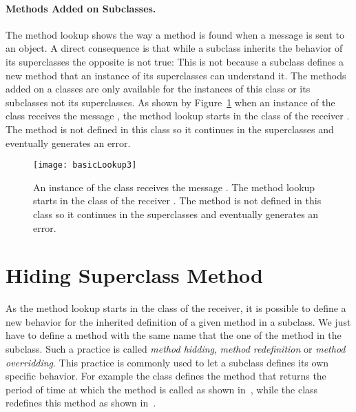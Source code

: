 \paragraph{Methods Added on Subclasses.} 
The method lookup shows the way a method is found when a message is sent to an object. A direct consequence is that while a subclass inherits the behavior of its superclasses the opposite is not true: This is not because a subclass defines a new method that an instance of its superclasses can understand it. The methods added on a classes are only available for the instances of this class or its subclasses not its superclasses. As shown by Figure~\ref{fig:basicLookup3} when an instance of the class  receives the message ,  the method lookup starts in the class of the receiver . The method is not defined in this class so it  continues in the superclasses and eventually generates an error.



\begin{figure}[h]
\centerline{\texttt{[image: basicLookup3]}} 
\caption{An instance of the class  receives the message . The method lookup starts in the class of the receiver . The method is not defined in this class so it  continues in the superclasses and eventually generates an error. \label{fig:basicLookup3}}
\end{figure}




\section{Hiding Superclass Method}
As the method lookup starts in the class of the receiver, it is possible to define a new behavior for the inherited definition of a given method in a subclass. We just have to define a method with the same name that the one of the method in the subclass. Such a practice is called \emph{method hidding}, \emph{method redefinition} or \emph{method overridding}. This practice is commonly used to let a subclass defines its own specific behavior. For example the class  defines the method  that returns the period of time at which the  method is called as shown in~, while the class  redefines this method as shown in~.

